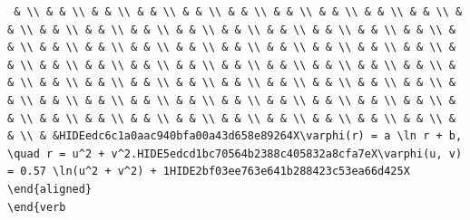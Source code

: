 \documentclass[
  ukrainian,
]{article}
\begin{document}
\begin{verbatim}
 & \\ & & \\ & & \\ & & \\ & & \\ & & \\ & & \\ & & \\ & & \\ & & \\ & & \\ & & \\ & & \\ & & \\ & & \\ & & \\ & & \\ & & \\ & & \\ & & \\ & & \\ & & \\ & & \\ & & \\ & & \\ & & \\ & & \\ & & \\ & & \\ & & \\ & & \\ & & \\ & & \\ & & \\ & & \\ & & \\ & & \\ & & \\ & & \\ & & \\ & & \\ & & \\ & & \\ & & \\ & & \\ & & \\ & & \\ & & \\ & & \\ & & \\ & & \\ & & \\ & & \\ & & \\ & & \\ & & \\ & & \\ & & \\ & & \\ & & \\ & & \\ & & \\ & & \\ & & \\ & & \\ & & \\ & & \\ & & \\ & & \\ & & \\ & & \\ & &HIDEedc6c1a0aac940bfa00a43d658e89264X\varphi(r) = a \ln r + b, \quad r = u^2 + v^2.HIDE5edcd1bc70564b2388c405832a8cfa7eX\varphi(u, v) = 0.57 \ln(u^2 + v^2) + 1HIDE2bf03ee763e641b288423c53ea66d425X \end{aligned}
\end{verb
\end{verbatim}
\end{document}
